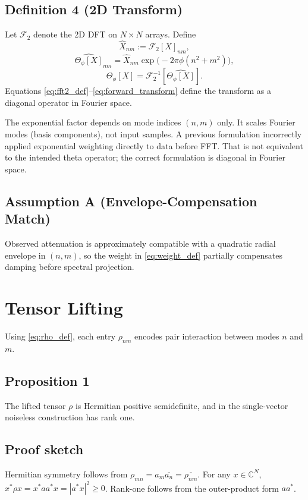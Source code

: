 \documentclass[11pt]{article}
\newcommand{\C}{\mathbb{C}}
\begin{document}
\subsection*{Definition 4 (2D Transform)}
Let $\mathcal{F}_2$ denote the 2D DFT on $N\times N$ arrays. Define
\begin{equation}
\widehat{X}_{nm}:=\mathcal{F}_2[X]_{nm},
\label{eq:fft2_def}
\end{equation}
\begin{equation}
\widehat{\Theta_{\phi}[X]}_{nm}=\widehat{X}_{nm}\exp\!\big(-2\pi\phi(n^2+m^2)\big),
\label{eq:fft2_index}
\end{equation}
\begin{equation}
\Theta_{\phi}[X]=\mathcal{F}_2^{-1}\!\left[\widehat{\Theta_{\phi}[X]}\right].
\label{eq:forward_transform}
\end{equation}
Equations \eqref{eq:fft2_def}--\eqref{eq:forward_transform} define the transform as a diagonal operator in Fourier space.

The exponential factor depends on mode indices $(n,m)$ only. It scales Fourier modes (basis components), not input samples.
A previous formulation incorrectly applied exponential weighting directly to data before FFT. That is not equivalent to the intended theta operator; the correct formulation is diagonal in Fourier space.

\subsection*{Assumption A (Envelope-Compensation Match)}
Observed attenuation is approximately compatible with a quadratic radial envelope in $(n,m)$, so the weight in \eqref{eq:weight_def} partially compensates damping before spectral projection.

\section{Tensor Lifting}
Using \eqref{eq:rho_def}, each entry $\rho_{nm}$ encodes pair interaction between modes $n$ and $m$.

\subsection*{Proposition 1}
The lifted tensor $\rho$ is Hermitian positive semidefinite, and in the single-vector noiseless construction has rank one.

\subsection*{Proof sketch}
Hermitian symmetry follows from $\rho_{mn}=a_m\overline{a_n}=\overline{\rho_{nm}}$. For any $x\in\C^N$, $x^{\ast}\rho x=x^{\ast}aa^{\ast}x=|a^{\ast}x|^2\ge 0$. Rank-one follows from the outer-product form $aa^{\ast}$.
\end{document}
